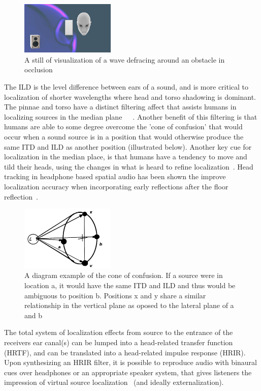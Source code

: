 \documentclass[paper=a4, fontsize=10pt, font=arial]{scrartcl} %
\numberwithin{equation}{section} %
\numberwithin{figure}{section} %
\numberwithin{table}{section} %
\begin{document}
\begin{figure}[H]
\centering
\includegraphics[width=0.4\textwidth]{defractionexample.JPG}
\centering
\caption{A still of visualization of a wave defracing around an obstacle in occlusion ~\cite{googlevr2016}}
\end{figure} 

The ILD is the level difference between ears of a sound, and is more critical to localization of shorter wavelengths where head and torso shadowing is dominant. The pinnae and torso have a distinct filtering affect that assists humans in localizing sources in the median plane~\cite{Blauert1997}~\cite{Begault1995}~\cite{Wiggins2004}. Another benefit of this filtering is that humans are able to some degree overcome the 'cone of confusion' that would occur when a sound source is in a position that would otherwise produce the same ITD and ILD as another position (illustrated below). Another key cue for localization in the median place, is that humans have a tendency to move and tild their heads, using the changes in what is heard to refine localization~\cite{Blauert1997}. Head tracking in headphone based spatial audio has been shown the improve localization accuracy when incorporating early reflections after the floor reflection~\cite{Angel2002}.

\begin{figure}[H]
\centering
\includegraphics[width=0.4\textwidth]{coneofconfusion.jpg}
\centering
\caption{A diagram example of the cone of confusion. If a source were in location a, it would have the same ITD and ILD and thus would be ambiguous to position b. Positions x and y share a similar relationship in the vertical plane as oposed to the lateral plane of a and b~\cite{Begault1995}}
\end{figure}

The total system of localization effects from source to the entrance of the receivers ear canal(s) can be lumped into a head-related transfer function (HRTF), and can be translated into a head-related impulse response (HRIR). Upon synthesizing an HRIR filter, it is possible to reproduce audio with binaural cues over headphones or an appropriate speaker system, that gives listeners the impression of virtual source localization ~\cite{rumsey2012spatial}(and ideally externalization). 
\end{document}
